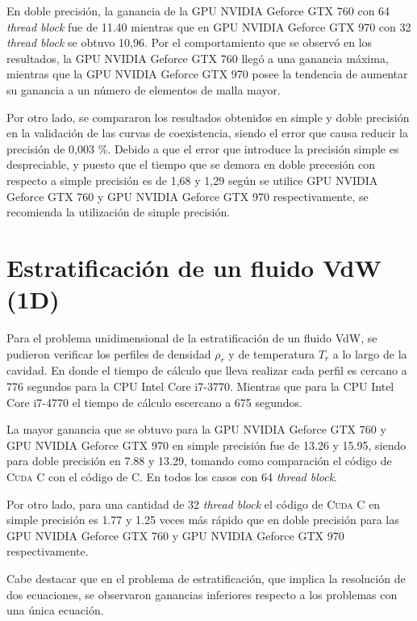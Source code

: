 En doble precisión, la ganancia de la GPU NVIDIA Geforce GTX 760 con 64 \textit{thread block} fue de 11.40 mientras que en GPU NVIDIA Geforce GTX 970 con 32 \textit{thread block} se obtuvo 10,96. Por el comportamiento que se observó en los resultados, la GPU NVIDIA Geforce GTX 760 llegó a una ganancia máxima, mientras que la GPU NVIDIA Geforce GTX 970 posee la tendencia de aumentar su ganancia a un número de elementos de malla mayor.

\newpage

Por otro lado, se compararon los resultados obtenidos en simple y doble precisión en la validación de las curvas de coexistencia, siendo el error que causa reducir la precisión de 0,003 \%.  Debido a que el error que introduce la precisión simple es despreciable, y puesto que el tiempo que se demora en doble precesión con respecto a simple precisión es de 1,68 y 1,29 según se utilice GPU NVIDIA Geforce GTX 760 y GPU NVIDIA Geforce GTX 970 respectivamente, se recomienda la utilización de simple precisión.

\section{Estratificación de un fluido VdW (1D)}

Para el problema unidimensional de la estratificación de un fluido VdW, se pudieron verificar los perfiles de densidad $\rho_r$ y de temperatura $T_r$ a lo largo de la cavidad. En donde el tiempo de cálculo que lleva realizar cada perfil es cercano a 776 segundos para la CPU Intel Core i7-3770. Mientras que para la CPU Intel Core i7-4770 el tiempo de cálculo escercano a 675 segundos.

La mayor ganancia que se obtuvo para la GPU NVIDIA Geforce GTX 760 y GPU NVIDIA Geforce GTX 970 en simple precisión fue de 13.26 y 15.95, siendo para doble precisión en 7.88 y 13.29, tomando como comparación el código de \textsc{Cuda C} con el código de \textsc{C}. En todos los casos con 64 \textit{thread block}.

Por otro lado, para una cantidad de 32 \textit{thread block} el código de \textsc{Cuda C}  en simple precisión es 1.77 y 1.25 veces más rápido que en doble precisión para  las GPU NVIDIA Geforce GTX 760 y GPU NVIDIA Geforce GTX 970 respectivamente. 

Cabe destacar que en el problema de estratificación, que implica la resolución de dos ecuaciones, se observaron ganancias inferiores respecto a los problemas con una única ecuación.

